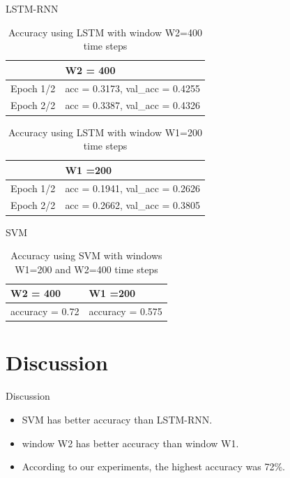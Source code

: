 \documentclass[xcolor=dvipsnames]{beamer} %
\begin{document}
	\begin{frame}{LSTM-RNN}
	    \begin{table}[]
            \begin{tabular}{|l|l|}
            \hline
                      & W2 = 400                        \\ \hline
            Epoch 1/2 & acc = 0.3173, val\_acc = 0.4255 \\ \hline
            Epoch 2/2 & acc = 0.3387, val\_acc = 0.4326 \\ \hline
            \end{tabular}
            \caption{Accuracy using LSTM with window W2=400 time steps}
        \end{table}
        
        \begin{table}[]
            \begin{tabular}{|l|l|}
            \hline
                      & W1 =200                        \\ \hline
            Epoch 1/2 & acc = 0.1941, val\_acc = 0.2626 \\ \hline
            Epoch 2/2 & acc = 0.2662, val\_acc = 0.3805 \\ \hline
            \end{tabular}
            \caption{Accuracy using LSTM with window W1=200 time steps}
        \end{table}
	\end{frame}
	
	\begin{frame}{SVM}
	    \begin{table}[h]
            \centering
            \begin{tabular}{|l|l|}
            \hline
            W2 = 400        & W1 =200          \\ \hline
            accuracy = 0.72 & accuracy = 0.575 \\ \hline
            \end{tabular}
            \caption{Accuracy using SVM with windows W1=200 and W2=400 time steps}
            \label{table:SVM}
        \end{table}
	\end{frame}

	\section{Discussion}
		
	\begin{frame}{Discussion}
	\begin{itemize}
		\item SVM has better accuracy than LSTM-RNN.
		\item window W2 has better accuracy than window W1.
		\item According to our experiments, the highest accuracy was 72\%.
	\end{itemize}
	\end{frame}
\end{document}
